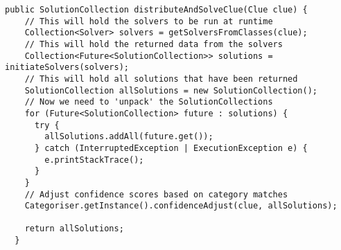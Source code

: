 \begin{lstlisting}[caption={Method to distrbute the clue out to all solvers},
                   label=distributeAndSolveClue] 
public SolutionCollection distributeAndSolveClue(Clue clue) {
    // This will hold the solvers to be run at runtime
    Collection<Solver> solvers = getSolversFromClasses(clue);
    // This will hold the returned data from the solvers
    Collection<Future<SolutionCollection>> solutions = initiateSolvers(solvers);
    // This will hold all solutions that have been returned
    SolutionCollection allSolutions = new SolutionCollection();
    // Now we need to 'unpack' the SolutionCollections
    for (Future<SolutionCollection> future : solutions) {
      try {
        allSolutions.addAll(future.get());
      } catch (InterruptedException | ExecutionException e) {
        e.printStackTrace();
      }
    }
    // Adjust confidence scores based on category matches
    Categoriser.getInstance().confidenceAdjust(clue, allSolutions);

    return allSolutions;
  }
\end{lstlisting}  
